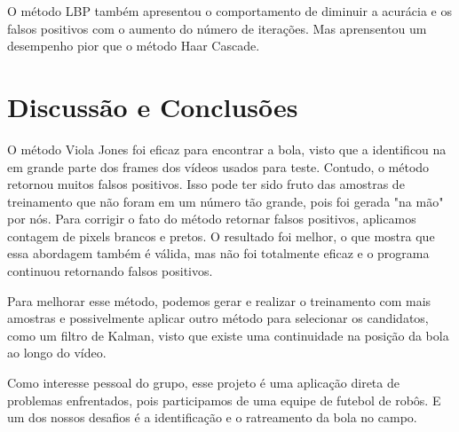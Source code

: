 \documentclass{bmvc2k}
\begin{document}
O método LBP também apresentou o comportamento de diminuir a acurácia e os falsos positivos com o aumento do número de iterações. Mas aprensentou um desempenho pior que o método Haar Cascade.




\section{Discussão e Conclusões}

O método Viola Jones foi eficaz para encontrar a bola, visto que a identificou na em grande parte dos frames dos vídeos usados para teste. Contudo, o método retornou muitos falsos positivos. Isso pode ter sido fruto das amostras de treinamento que não foram em um número tão grande, pois foi gerada "na mão" por nós. Para corrigir o fato do método retornar falsos positivos, aplicamos contagem de pixels brancos e pretos. O resultado foi melhor, o que mostra que essa abordagem também é válida, mas não foi totalmente eficaz e o programa continuou retornando falsos positivos.

Para melhorar esse método, podemos gerar e realizar o treinamento com mais amostras e possivelmente aplicar outro método para selecionar os candidatos, como um filtro de Kalman, visto que existe uma continuidade na posição da bola ao longo do vídeo.


Como interesse pessoal do grupo, esse projeto é uma aplicação direta de problemas enfrentados, pois participamos de uma equipe de futebol de robôs. E um dos nossos desafios é a identificação e o ratreamento da bola no campo.

\newpage


\end{document}
